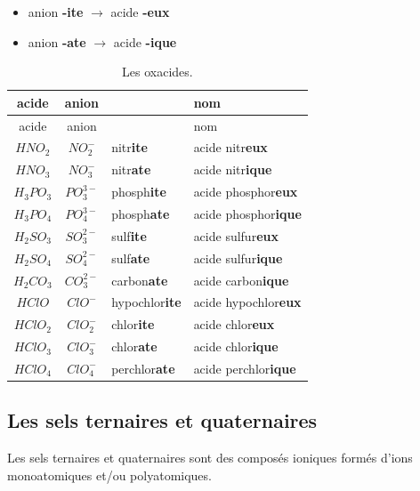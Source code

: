 \documentclass[
  11pt,
  a4paper,
  openany]{book}
\providecommand{\tightlist}{%
  \setlength{\itemsep}{0pt}\setlength{\parskip}{0pt}}
\begin{document}
\begin{itemize}
\tightlist
\item
  anion \textbf{-ite} \(\longrightarrow\) acide \textbf{-eux}
\item
  anion \textbf{-ate} \(\longrightarrow\) acide \textbf{-ique}
\end{itemize}

\newpage

\begin{longtable}[]{@{}ccll@{}}
\caption{\label{tab:oxacides} Les oxacides.}\tabularnewline
\toprule()
acide & anion & & nom \\
\midrule()
\endfirsthead
\toprule()
acide & anion & & nom \\
\midrule()
\endhead
\(HNO_2\) & \(NO_2^{-}\) & nitr\textbf{ite} & acide nitr\textbf{eux} \\
\(HNO_3\) & \(NO_3^{-}\) & nitr\textbf{ate} & acide nitr\textbf{ique} \\
\(H_3PO_3\) & \(PO_3^{3-}\) & phosph\textbf{ite} & acide phosphor\textbf{eux} \\
\(H_3PO_4\) & \(PO_4^{3-}\) & phosph\textbf{ate} & acide phosphor\textbf{ique} \\
\(H_2SO_3\) & \(SO_3^{2-}\) & sulf\textbf{ite} & acide sulfur\textbf{eux} \\
\(H_2SO_4\) & \(SO_4^{2-}\) & sulf\textbf{ate} & acide sulfur\textbf{ique} \\
\(H_2CO_3\) & \(CO_3^{2-}\) & carbon\textbf{ate} & acide carbon\textbf{ique} \\
\(HClO\) & \(ClO^{-}\) & hypochlor\textbf{ite} & acide hypochlor\textbf{eux} \\
\(HClO_2\) & \(ClO_2^{-}\) & chlor\textbf{ite} & acide chlor\textbf{eux} \\
\(HClO_3\) & \(ClO_3^{-}\) & chlor\textbf{ate} & acide chlor\textbf{ique} \\
\(HClO_4\) & \(ClO_4^{-}\) & perchlor\textbf{ate} & acide perchlor\textbf{ique} \\
\bottomrule()
\end{longtable}

\hypertarget{les-sels-ternaires-et-quaternaires}{%
\subsection{Les sels ternaires et quaternaires}\label{les-sels-ternaires-et-quaternaires}}

Les sels ternaires et quaternaires sont des composés ioniques formés d'ions monoatomiques et/ou polyatomiques.
\end{document}
